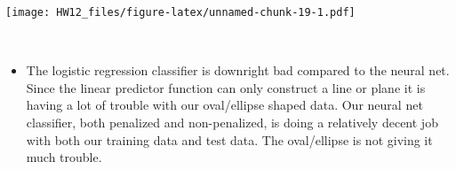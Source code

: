 \documentclass[]{article}
\newenvironment{Shaded}{\begin{snugshade}}{\end{snugshade}}
\newcommand{\KeywordTok}[1]{\textcolor[rgb]{0.13,0.29,0.53}{\textbf{#1}}}
\newcommand{\DataTypeTok}[1]{\textcolor[rgb]{0.13,0.29,0.53}{#1}}
\newcommand{\DecValTok}[1]{\textcolor[rgb]{0.00,0.00,0.81}{#1}}
\newcommand{\FloatTok}[1]{\textcolor[rgb]{0.00,0.00,0.81}{#1}}
\newcommand{\StringTok}[1]{\textcolor[rgb]{0.31,0.60,0.02}{#1}}
\newcommand{\ControlFlowTok}[1]{\textcolor[rgb]{0.13,0.29,0.53}{\textbf{#1}}}
\newcommand{\OperatorTok}[1]{\textcolor[rgb]{0.81,0.36,0.00}{\textbf{#1}}}
\newcommand{\NormalTok}[1]{#1}
\begin{document}
\begin{Shaded}
\end{Shaded}

\texttt{[image: HW12\_files/figure-latex/unnamed-chunk-19-1.pdf]}

~

\begin{itemize} \item[] The logistic regression classifier is downright bad compared to the neural net. Since the linear predictor function can only construct a line or plane it is having a lot of trouble with our oval/ellipse shaped data. Our neural net classifier, both penalized and non-penalized, is doing a relatively decent job with both our training data and test data. The oval/ellipse is not giving it much trouble.
 \end{itemize}
\end{document}
